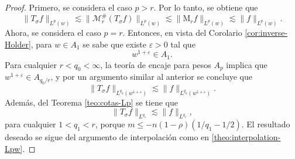 \begin{proof}
Primero, se considera el caso $p>r$. Por lo tanto, se obtiene que
\begin{equation*}
	\|T_\sigma f\|_{L^p(w)} \lesssim\| \mathcal{M}^\#_r(T_\sigma f)\|_{L^p(w)} \lesssim\|\mathrm{M}_rf\|_{L^p(w)} \lesssim\|f\|_{L^p(w)}.
\end{equation*}
Ahora, se considera el caso $p=r$. Entonces, en vista del Corolario \ref{cor:inverse-Holder}, para $w\in A_1$ se sabe que existe $\varepsilon>0$ tal que 
\begin{equation*}
	w^{1+\varepsilon} \in A_1.
\end{equation*}
Para cualquier $r<q_0<\infty$, la teoría de encaje para pesos $A_p$ implica que $w^{1+\varepsilon}\in A_{q_0/r}$, y por un argumento similar al anterior se concluye que 
\begin{equation*}
	\|T_\sigma f\|_{L^{q_0}(w^{1+\varepsilon})} \lesssim\|f\|_{L^{q_0}(w^{1+\varepsilon})}.
\end{equation*}
Además, del Teorema \ref{teo:cotas-Lp} se tiene que 
\begin{equation*}
	\|T_\sigma f\|_{L^{q_1}} \lesssim\|f\|_{L^{q_1}},
\end{equation*}
para cualquier $1<q_1<r$, porque $m \leq -n(1-\rho)(1/q_1 - 1/2)$. El resultado deseado se sigue del argumento de interpolación como en \cref{theo:interpolation-Lpw}.
\end{proof}

